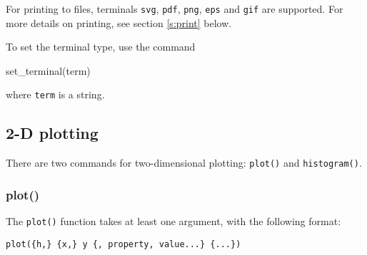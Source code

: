 \documentclass[11pt]{article}
\newcommand{\cmd}[1]{\texttt{#1}}
\begin{document}
For printing to files, terminals \cmd{svg}, \cmd{pdf}, \cmd{png}, \cmd{eps} and
\cmd{gif} are supported. For more details on printing, see section
\ref{s:print} below.

To set the terminal type, use the command
\begin{juliacode}
set_terminal(term)
\end{juliacode}
where \cmd{term} is a string.

\subsection{2-D plotting}

There are two commands for two-dimensional plotting: \cmd{plot()} and
\cmd{histogram()}.

\subsubsection{plot()}

The \cmd{plot()} function takes at least one argument, with the following
format:

\cmd{plot(\{h,\} \{x,\} y \{, property, value...\} \{...\})}
\end{document}
